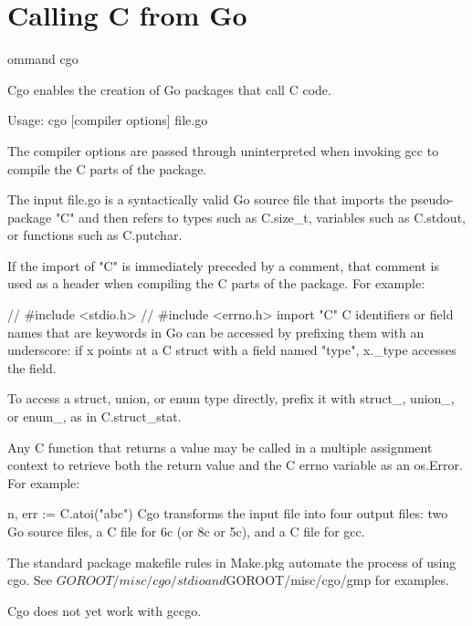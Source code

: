 
\section{Calling C from Go}


ommand cgo

Cgo enables the creation of Go packages that call C code.

Usage: cgo [compiler options] file.go

The compiler options are passed through uninterpreted when invoking gcc to compile the C parts of the package.

The input file.go is a syntactically valid Go source file that imports the pseudo-package "C" and then refers to types such as C.size_t, variables such as C.stdout, or functions such as C.putchar.

If the import of "C" is immediately preceded by a comment, that comment is used as a header when compiling the C parts of the package. For example:

// #include <stdio.h>
// #include <errno.h>
import "C"
C identifiers or field names that are keywords in Go can be accessed by prefixing them with an underscore: if x points at a C struct with a field named "type", x._type accesses the field.

To access a struct, union, or enum type directly, prefix it with struct_, union_, or enum_, as in C.struct_stat.

Any C function that returns a value may be called in a multiple assignment context to retrieve both the return value and the C errno variable as an os.Error. For example:

n, err := C.atoi("abc")
Cgo transforms the input file into four output files: two Go source files, a C file for 6c (or 8c or 5c), and a C file for gcc.

The standard package makefile rules in Make.pkg automate the process of using cgo. See $GOROOT/misc/cgo/stdio and $GOROOT/misc/cgo/gmp for examples.

Cgo does not yet work with gccgo.
